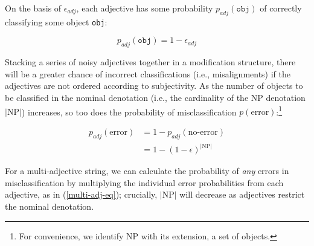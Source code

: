 \documentclass[preprint,authoryear]{elsarticle}\frenchspacing
\newcommand{\gcs}[1]{\textcolor{blue}{[gcs: #1]}}
\begin{document}
%
%
%
On the basis of $\epsilon_{adj}$, each adjective has some probability $p_{adj}(\texttt{obj})$ of correctly classifying some object \texttt{obj}: 

\setcounter{equation}{2}
\begin{equation}
p_{adj}(\texttt{obj}) = 1-\epsilon_{adj}
\end{equation}

\noindent
Stacking a series of noisy adjectives together in a modification structure, there will be a greater chance of incorrect classifications (i.e., misalignments) if the adjectives are not ordered according to subjectivity. %
As the number of objects to be classified in the nominal denotation (i.e., the cardinality of the NP denotation $|\textrm{NP}|$) increases, so too does the probability of misclassification $p(\textrm{error})$:\footnote{For convenience, we identify NP with its extension, a set of objects.} 
	
\setcounter{equation}{3}
\begin{align}
p_{adj}(\textrm{error}) &= 1 - p_{adj}(\textrm{no-error}) \nonumber\\
&= 1 - (1-\epsilon)^{|\textrm{NP}|}
\end{align}
	
For a multi-adjective string, we can calculate the probability of \emph{any} errors in misclassification by multiplying the individual error probabilities from each adjective, as in (\ref{multi-adj-eq}); crucially, $|\textrm{NP}|$ will decrease as adjectives restrict the nominal denotation. 
	
\end{document}
